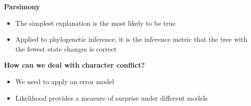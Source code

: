 \documentclass{beamer}
\begin{document}
\begin{frame}
\textbf{Parsimony}
\begin{itemize}
 \item The simplest explanation is the most likely to be true
 \item Applied to phylogenetic inference, it is the inference metric that the tree with the fewest state changes is correct
\end{itemize}


\end{frame}





\begin{frame}
\textbf{How can we deal with character conflict?}
\begin{itemize}
 \item We need to apply an error model
 \item Likelihood provides a measure of surprise under different models
\end{itemize}
\end{frame}



\end{document}
